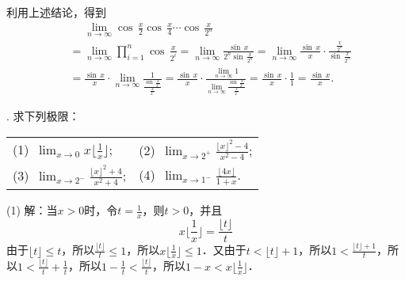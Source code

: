 \noindent 利用上述结论，得到
\begin{align}
    &\mathrel{\phantom{=}} \lim_{n \to \infty} \cos \, \frac{x}{2} \cos \, \frac{x}{4} \cdots \cos \, \frac{x}{2^n} \\
    &= \lim_{n \to \infty} \prod_{i=1}^n \cos \, \frac{x}{2^i} = \lim_{n \to \infty} \frac{\sin \, x}{2^{n} \sin \, \displaystyle\frac{x}{2^n}} = \lim_{n \to \infty} \frac{\sin \, x}{x} \cdot \frac{\displaystyle\frac{x}{2^n}}{\sin \, \displaystyle\frac{x}{2^n}} \\
    &= \frac{\sin \, x}{x} \cdot \lim_{n \to \infty} \displaystyle \frac{1}{\displaystyle\frac{\sin \, \displaystyle\frac{x}{2^n}}{\displaystyle\frac{x}{2^n}}} = \frac{\sin \, x}{x} \cdot \frac{\displaystyle\lim_{n \to \infty} 1}{\displaystyle\lim_{n \to \infty} \displaystyle\frac{\sin \, \displaystyle\frac{x}{2^n}}{\displaystyle\frac{x}{2^n}}} = \displaystyle\frac{\sin \, x}{x} \cdot \displaystyle\frac{1}{1} = \frac{\sin \, x}{x}.
\end{align}

. 求下列极限：
\begin{table}[H]
    \centering
    \begin{tabularx}{\textwidth} {  >{\raggedright\arraybackslash}X >{\raggedright\arraybackslash}X  }
       (1)~$\displaystyle\lim_{x \to 0} x \bigg\lfloor \displaystyle \frac{1}{x} \bigg\rfloor$; & (2)~$\displaystyle \lim_{x \to 2^+} \displaystyle\frac{\lfloor x \rfloor^2 - 4}{x^2 - 4}$; \\ [1em]
       (3)~$\displaystyle\lim_{x \to 2^-} \displaystyle\frac{\lfloor x \rfloor^2 + 4}{x^2 + 4}$; & (4)~$\displaystyle\lim_{x \to 1^-} \displaystyle\frac{\lfloor 4x \rfloor}{1+x}$.
    \end{tabularx}
\end{table}

\noindent (1) 解：当$x > 0$时，令$t = \displaystyle\frac{1}{x}$，则$t > 0$，并且
\begin{equation}
    x \bigg \lfloor \frac{1}{x} \bigg\rfloor = \frac{\lfloor t \rfloor}{t}
\end{equation}
由于$\lfloor t \rfloor \leq t$，所以$\displaystyle\frac{\lfloor t \rfloor}{t} \leq 1$，所以$x \bigg\lfloor \displaystyle\frac{1}{x} \bigg\rfloor \leq 1$．又由于$t < \lfloor t \rfloor + 1$，所以$1 < \displaystyle\frac{\lfloor t \rfloor + 1}{t}$，所以$1 < \displaystyle\frac{\lfloor t \rfloor}{t} + \displaystyle\frac{1}{t}$，所以$1 - \displaystyle\frac{1}{t} < \displaystyle\frac{\lfloor t \rfloor}{t}$，所以$1-x < x \bigg \lfloor \displaystyle\frac{1}{x} \bigg\rfloor$．

